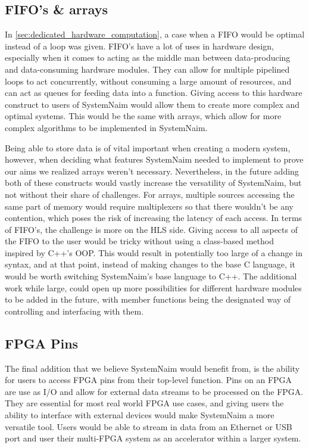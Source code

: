 \subsection{FIFO's \& arrays}

In \autoref{sec:dedicated_hardware_computation}, a case when a FIFO would be optimal instead of a loop was given. FIFO's have a lot of uses in hardware design, especially when it comes to acting as the middle man between data-producing and data-consuming hardware modules. They can allow for multiple pipelined loops to act concurrently, without consuming a large amount of resources, and can act as queues for feeding data into a function. Giving access to this hardware construct to users of SystemNaim would allow them to create more complex and optimal systems. This would be the same with arrays, which allow for more complex algorithms to be implemented in SystemNaim. 

Being able to store data is of vital important when creating a modern system, however, when deciding what features SystemNaim needed to implement to prove our aims we realized arrays weren't necessary. Nevertheless, in the future adding both of these constructs would vastly increase the versatility of SystemNaim, but not without their share of challenges. For arrays, multiple sources accessing the same part of memory would require multiplexers so that there wouldn't be any contention, which poses the risk of increasing the latency of each access. In terms of FIFO's, the challenge is more on the HLS side. Giving access to all aspects of the FIFO to the user would be tricky without using a class-based method inspired by C++'s OOP. This would result in potentially too large of a change in syntax, and at that point, instead of making changes to the base C language, it would be worth switching SystemNaim's base language to C++. The additional work while large, could open up more possibilities for different hardware modules to be added in the future, with member functions being the designated way of controlling and interfacing with them.

\subsection{FPGA Pins}

The final addition that we believe SystemNaim would benefit from, is the ability for users to access FPGA pins from their top-level function. Pins on an FPGA are use as I/O and allow for external data streams to be processed on the FPGA. They are essential for most real world FPGA use cases, and giving users the ability to interface with external devices would make SystemNaim a more versatile tool. Users would be able to stream in data from an Ethernet or USB port and user their multi-FPGA system as an accelerator within a larger system. 

